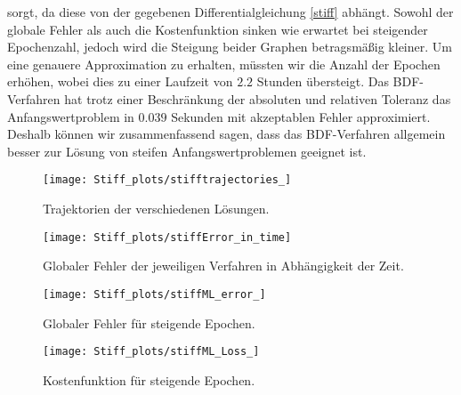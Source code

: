 sorgt, da diese von der gegebenen Differentialgleichung \eqref{stiff} abhängt.
Sowohl der globale Fehler als auch die Kostenfunktion sinken wie erwartet bei steigender Epochenzahl, jedoch wird die
Steigung beider Graphen betragsmäßig kleiner. Um eine genauere Approximation zu erhalten, müssten wir die Anzahl der
Epochen erhöhen, wobei dies zu einer Laufzeit von $2.2$ Stunden übersteigt. Das BDF-Verfahren hat trotz einer
Beschränkung der absoluten und relativen Toleranz das Anfangswertproblem in $0.039$ Sekunden mit akzeptablen
Fehler approximiert. Deshalb können wir zusammenfassend sagen, dass das BDF-Verfahren allgemein besser zur Lösung
von steifen Anfangswertproblemen geeignet ist.
\begin{figure}
       \centering
       \texttt{[image: Stiff\_plots/stifftrajectories\_]}
       \caption{Trajektorien der verschiedenen Lösungen.}
       \label{fig:stiff-trajectories}
\end{figure}
\begin{figure}
       \centering
       \texttt{[image: Stiff\_plots/stiffError\_in\_time]}
       \caption{Globaler Fehler  der jeweiligen Verfahren in Abhängigkeit der Zeit.}
       \label{fig:stiff-error-in-time}
\end{figure}
\begin{figure}
       \centering
       \texttt{[image: Stiff\_plots/stiffML\_error\_]}
       \caption{Globaler Fehler für steigende Epochen.}
       \label{fig:stiff-error}
\end{figure}
\begin{figure}
       \centering
       \texttt{[image: Stiff\_plots/stiffML\_Loss\_]}
       \caption{Kostenfunktion für steigende Epochen.}
       \label{fig:stiff-loss}
\end{figure}
\clearpage

